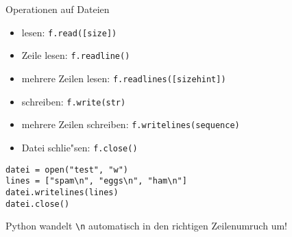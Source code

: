 \begin{frame}[fragile]{Operationen auf Dateien}
\begin{itemize}
\item \alert{lesen}: \lstinline{f.read([size])}
\item Zeile lesen: \lstinline{f.readline()}
\item mehrere Zeilen lesen: \lstinline{f.readlines([sizehint])}
\item \alert{schreiben}: \lstinline{f.write(str)}
\item mehrere Zeilen schreiben: \lstinline{f.writelines(sequence)}
\item Datei \alert{schlie"sen}: \lstinline{f.close()}
\end{itemize}
\begin{lstlisting}[style=Python]
datei = open("test", "w")
lines = ["spam\n", "eggs\n", "ham\n"]
datei.writelines(lines)
datei.close()
\end{lstlisting}
Python wandelt \lstinline{\n} automatisch in den richtigen Zeilenumruch um!
\end{frame}
